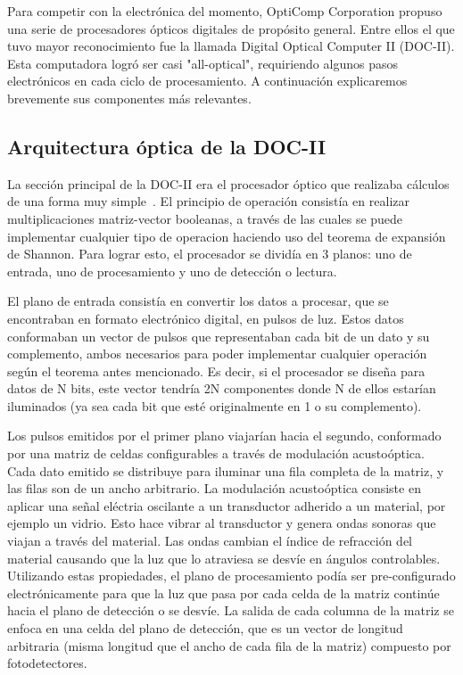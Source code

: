 \documentclass[12pt,a4paper]{report}
\begin{document}
Para competir con la electrónica del momento, OptiComp Corporation propuso una serie de procesadores ópticos digitales de propósito general. Entre ellos el que tuvo mayor reconocimiento fue la llamada Digital Optical Computer II (DOC-II). Esta computadora logró ser casi "all-optical", requiriendo algunos pasos electrónicos en cada ciclo de procesamiento. A continuación explicaremos brevemente sus componentes más relevantes.

\subsection{Arquitectura óptica de la DOC-II}

La sección principal de la DOC-II era el procesador óptico que realizaba cálculos de una forma muy simple~\cite{docII-arquitectura}. El principio de operación consistía en realizar multiplicaciones matriz-vector booleanas, a través de las cuales se puede implementar cualquier tipo de operacion haciendo uso del teorema de expansión de Shannon. Para lograr esto, el procesador se dividía en 3 planos: uno de entrada, uno de procesamiento y uno de detección o lectura.

El plano de entrada consistía en convertir los datos a procesar, que se encontraban en formato electrónico digital, en pulsos de luz. Estos datos conformaban un vector de pulsos que representaban cada bit de un dato y su complemento, ambos necesarios para poder implementar cualquier operación según el teorema antes mencionado. Es decir, si el procesador se diseña para datos de N bits, este vector tendría 2N componentes donde N de ellos estarían iluminados (ya sea cada bit que esté originalmente en 1 o su complemento).

Los pulsos emitidos por el primer plano viajarían hacia el segundo, conformado por una matriz de celdas configurables a través de modulación acustoóptica. Cada dato emitido se distribuye para iluminar una fila completa de la matriz, y las filas son de un ancho arbitrario. La modulación acustoóptica consiste en aplicar una señal eléctria oscilante a un transductor adherido a un material, por ejemplo un vidrio. Esto hace vibrar al transductor y genera ondas sonoras que viajan a través del material. Las ondas cambian el índice de refracción del material causando que la luz que lo atraviesa se desvíe en ángulos controlables. Utilizando estas propiedades, el plano de procesamiento podía ser pre-configurado electrónicamente para que la luz que pasa por cada celda de la matriz continúe hacia el plano de detección o se desvíe. La salida de cada columna de la matriz se enfoca en una celda del plano de detección, que es un vector de longitud arbitraria (misma longitud que el ancho de cada fila de la matriz) compuesto por fotodetectores.
\end{document}
